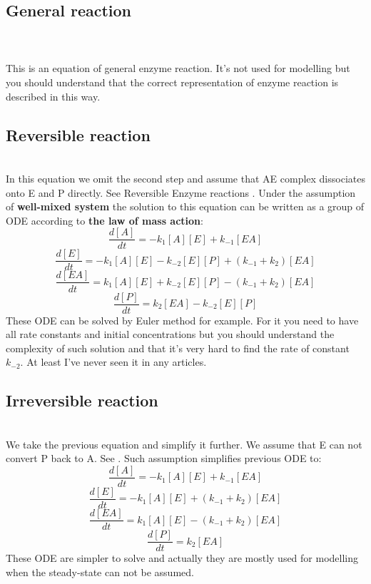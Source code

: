\documentclass[twoside,twocolumn]{article}
\begin{document}
\subsection{General reaction}
\label{subsec:enzyme_general}
\\\\This is an equation of general enzyme reaction. It's not used for modelling but you should understand that the correct representation of enzyme reaction is described in this way. 

\subsection{Reversible reaction}
\label{subsec:enzyme_reversible}
\\In this equation we omit the second step and assume that AE complex dissociates onto E and P directly. See Reversible Enzyme reactions \cite[p.~75]{bisswanger_enzyme_2002}. Under the assumption of \textbf{well-mixed system} the solution to this equation can be written as a group of ODE according to \textbf{the law of mass action}:
\[ \frac{d[A]}{dt} = -k_{1}[A][E] + k_{-1}[EA]\]
\[ \frac{d[E]}{dt} = -k_{1}[A][E] - k_{-2}[E][P] + (k_{-1} + k_{2})[EA]\]
\[ \frac{d[EA]}{dt} = k_{1}[A][E] + k_{-2}[E][P] - (k_{-1} + k_{2})[EA]\]
\[ \frac{d[P]}{dt} = k_{2}[EA] - k_{-2}[E][P]\]
These ODE can be solved by Euler method for example. For it you need to have all rate constants and initial concentrations but you should understand the complexity of such solution and that it's very hard to find the rate of constant $k_{-2}$. At least I've never seen it in any articles.

\subsection{Irreversible reaction}
\label{subsec:enzyme_irreversible}
\\We take the previous equation and simplify it further. We assume that E can not convert P back to A. See \cite[p.~55]{bisswanger_enzyme_2002}. Such assumption simplifies previous ODE to:
\[ \frac{d[A]}{dt} = -k_{1}[A][E] + k_{-1}[EA]\]
\[ \frac{d[E]}{dt} = -k_{1}[A][E] + (k_{-1} + k_{2})[EA]\]
\[ \frac{d[EA]}{dt} = k_{1}[A][E] - (k_{-1} + k_{2})[EA]\]
\[ \frac{d[P]}{dt} = k_{2}[EA]\]
These ODE are simpler to solve and actually they are mostly used for modelling when the steady-state can not be assumed.
\end{document}
